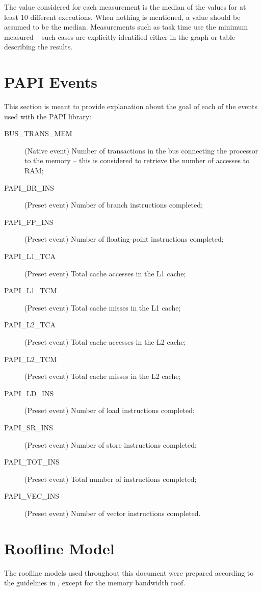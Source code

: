 \documentclass[abstract=on,9pt,twocolumn]{scrartcl}
\begin{document}
The value considered for each measurement is the median of the values for at least 10 different executions. When nothing is mentioned, a value should be assumed to be the median. Measurements such as task time use the minimum measured -- such cases are explicitly identified either in the graph or table describing the results.

\section{PAPI Events}
\label{sec:events}
This section is meant to provide explanation about the goal of each of the events used with the PAPI library:
\begin{description}
	\item[\ttfamily BUS\_TRANS\_MEM]{(Native event) Number of transactions in the bus connecting the processor to the memory -- this is considered to retrieve the number of accesses to RAM;}
	\item[\ttfamily PAPI\_BR\_INS]{(Preset event) Number of branch instructions completed;}
	\item[\ttfamily PAPI\_FP\_INS]{(Preset event) Number of floating-point instructions completed;}
	\item[\ttfamily PAPI\_L1\_TCA]{(Preset event) Total cache accesses in the L1 cache;}
	\item[\ttfamily PAPI\_L1\_TCM]{(Preset event) Total cache misses in the L1 cache;}
	\item[\ttfamily PAPI\_L2\_TCA]{(Preset event) Total cache accesses in the L2 cache;}
	\item[\ttfamily PAPI\_L2\_TCM]{(Preset event) Total cache misses in the L2 cache;}
	\item[\ttfamily PAPI\_LD\_INS]{(Preset event) Number of load instructions completed;}
	\item[\ttfamily PAPI\_SR\_INS]{(Preset event) Number of store instructions completed;}
	\item[\ttfamily PAPI\_TOT\_INS]{(Preset event) Total number of instructions completed;}
	\item[\ttfamily PAPI\_VEC\_INS]{(Preset event) Number of vector instructions completed.}
\end{description}

\section{Roofline Model}
\label{sec:roofline}
The roofline models used throughout this document were prepared according to the guidelines in \cite{williams08}, except for the memory bandwidth roof.
\end{document}
